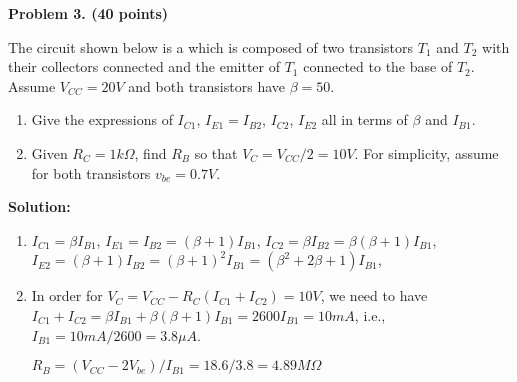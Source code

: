 

\item {\bf Problem 3. (40 points)} 

The circuit shown below is a
which is composed of two transistors $T_1$ and $T_2$ with their collectors 
connected and the emitter of $T_1$ connected to the base of $T_2$. Assume 
$V_{CC}=20V$ and both transistors have $\beta=50$. 
\begin{enumerate}
\item Give the expressions of $I_{C1}$, $I_{E1}=I_{B2}$, $I_{C2}$, $I_{E2}$
  all in terms of $\beta$ and $I_{B1}$.
\item Given $R_C=1 k\Omega$, find $R_B$ so that $V_C=V_{CC}/2=10V$. For 
  simplicity, assume for both transistors $v_{be}=0.7V$.

\end{enumerate}


 {\bf Solution:}
 
 \begin{enumerate}
 \item $I_{C1}=\beta I_{B1}$, $I_{E1}=I_{B2}=(\beta+1) I_{B1}$, 
 $I_{C2}=\beta I_{B2}=\beta (\beta+1) I_{B1}$, 
 $I_{E2}=(\beta+1) I_{B2}=(\beta+1)^2 I_{B1}=(\beta^2+2\beta+1)I_{B1}$, 
 
 \item In order for $V_C=V_{CC}-R_C (I_{C1}+I_{C2})=10V$, we need to have
 $I_{C1}+I_{C2}=\beta I_{B1}+\beta (\beta+1) I_{B1}=2600 I_{B1}=10 mA$, i.e.,
 $I_{B1}=10 mA/2600=3.8 \mu A$. 
 
 $R_B=(V_{CC}-2V_{be})/I_{B1}=18.6/3.8=4.89 M\Omega$
 \end{enumerate}



